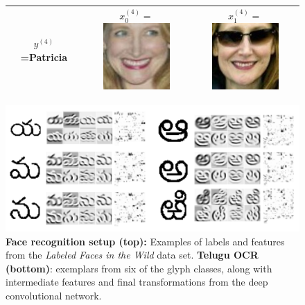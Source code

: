 \documentclass[twoside,11pt]{article}
\begin{document}
\begin{figure}[t]
\begin{tabular}{|c|c|c|}
$y^{(4)}$=Patricia & 
  $x_0^{(4)} = $\includegraphics[scale = 0.2]{face_photos/Patricia_Clarkson_0001.png} &  
  $x_1^{(4)} = $\includegraphics[scale = 0.2]{face_photos/Patricia_Clarkson_0004.png} \\ \hline
\end{tabular}
\includegraphics[scale=0.3]{telugu_glyphs.png}
\caption{\textbf{Face recognition setup (top):} Examples of labels and features from the \emph{Labeled Faces in the Wild} data set. \textbf{Telugu OCR (bottom)}: exemplars from six of the glyph classes, along with intermediate features and final transformations from the deep convolutional network.}
\label{fig:face_rec}
\end{figure}
\end{document}
